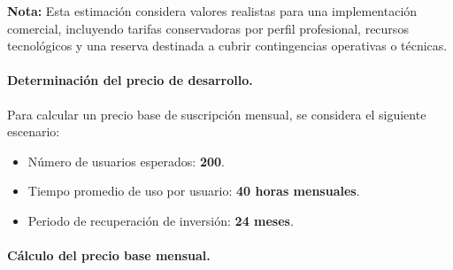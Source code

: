\begin{table}[H]
	\centering
	\renewcommand{\arraystretch}{1.5}
	\setlength{\tabcolsep}{12pt}
	\caption{Proyección de costos para una posible fase comercial}
	\label{tab:costos_desarrollo}
\end{table}

\noindent \textbf{Nota:} Esta estimación considera valores realistas para una implementación comercial, incluyendo tarifas conservadoras por perfil profesional, recursos tecnológicos y una reserva destinada a cubrir contingencias operativas o técnicas.

\paragraph{\textbf{Determinación del precio de desarrollo.}}

Para calcular un precio base de suscripción mensual, se considera el siguiente escenario:

\begin{itemize}
	\item Número de usuarios esperados: \textbf{200}.
	\item Tiempo promedio de uso por usuario: \textbf{40 horas mensuales}.
	\item Periodo de recuperación de inversión: \textbf{24 meses}.
\end{itemize}

\paragraph{\textbf{Cálculo del precio base mensual.}}

